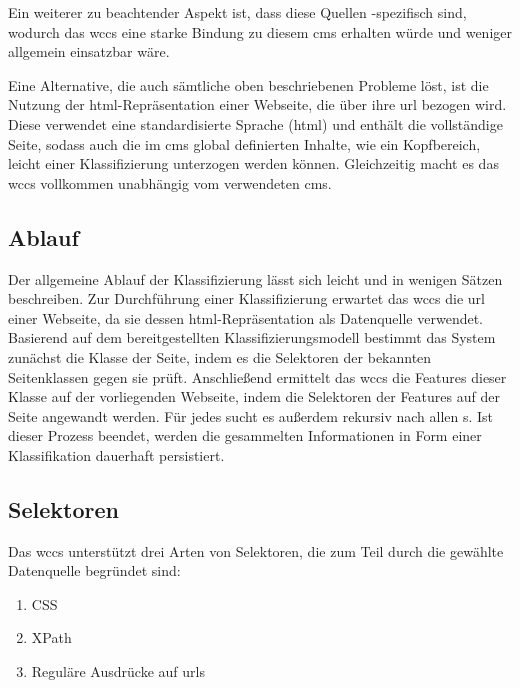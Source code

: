         Ein weiterer zu beachtender Aspekt ist, dass diese Quellen {\wordpress}-spezifisch sind,
        wodurch das \gls{wccs} eine starke Bindung zu diesem \gls{cms} erhalten würde
        und weniger allgemein einsatzbar wäre.

        Eine Alternative, die auch sämtliche oben beschriebenen Probleme löst,
        ist die Nutzung der \gls{html}-Repräsentation einer Webseite,
        die über ihre \gls{url} bezogen wird.
        Diese verwendet eine standardisierte Sprache (\gls{html}) und enthält
        die vollständige Seite, sodass auch die im \gls{cms} global definierten Inhalte,
        wie ein Kopfbereich, leicht einer Klassifizierung unterzogen werden können.
        Gleichzeitig macht es das \gls{wccs} vollkommen unabhängig vom verwendeten \gls{cms}.

    \subsection{Ablauf}
        \label{section:solutionConceptClassificationAlg}
        Der allgemeine Ablauf der Klassifizierung lässt sich leicht und in wenigen Sätzen beschreiben.
        Zur Durchführung einer Klassifizierung erwartet das \gls{wccs} die \gls{url} einer Webseite,
        da sie dessen \gls{html}-Repräsentation als Datenquelle verwendet.
        Basierend auf dem bereitgestellten Klassifizierungsmodell
        bestimmt das System zunächst die Klasse der Seite,
        indem es die Selektoren der bekannten Seitenklassen gegen sie prüft.
        Anschließend ermittelt das \gls{wccs} die Features dieser Klasse auf der vorliegenden Webseite,
        indem die Selektoren der Features auf der Seite angewandt werden.
        Für jedes {\contentFeature} sucht es außerdem rekursiv nach allen {\childFeature}s.
        Ist dieser Prozess beendet, werden die gesammelten Informationen in Form einer Klassifikation
        dauerhaft persistiert.

    \subsection{Selektoren}
        \label{section:conceptSupportedSelectors}
        Das \gls{wccs} unterstützt drei Arten von Selektoren,
        die zum Teil durch die gewählte Datenquelle begründet sind:

        \begin{enumerate}
            \item CSS
            \item XPath
            \item Reguläre Ausdrücke auf \glspl{url}
        \end{enumerate}

